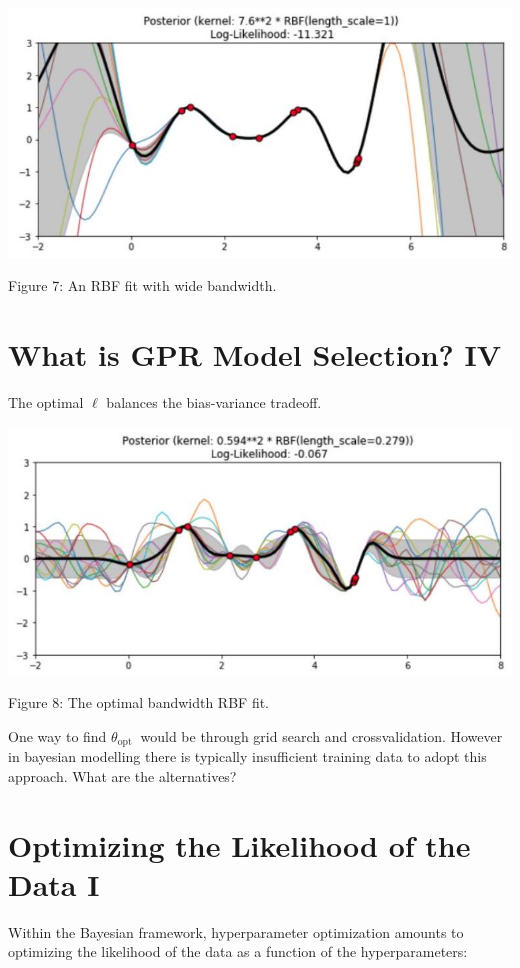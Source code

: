 \documentclass[11pt]{article}
\theoremstyle{plain} %
\theoremstyle{remark}
\begin{document}
\begin{center}
\includegraphics[width=\textwidth]{images/2023_11_26_5b299dbd302e8f129737g-61}
\end{center}

Figure 7: An RBF fit with wide bandwidth.

\section*{What is GPR Model Selection? IV}
The optimal $\ell$ balances the bias-variance tradeoff.

\begin{center}
\includegraphics[width=\textwidth]{images/2023_11_26_5b299dbd302e8f129737g-62}
\end{center}

Figure 8: The optimal bandwidth RBF fit.

One way to find $\theta_{\text {opt }}$ would be through grid search and
crossvalidation. However in bayesian modelling there is typically insufficient
training data to adopt this approach. What are the alternatives?

\section*{Optimizing the Likelihood of the Data I}
Within the Bayesian framework, hyperparameter optimization amounts to optimizing
the likelihood of the data as a function of the hyperparameters:
\end{document}
